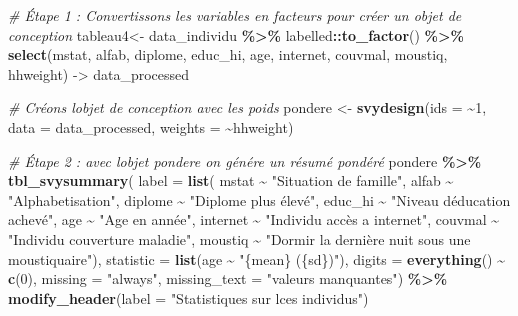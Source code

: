 \documentclass[
]{article}
\newenvironment{Shaded}{\begin{snugshade}}{\end{snugshade}}
\newcommand{\AttributeTok}[1]{\textcolor[rgb]{0.13,0.29,0.53}{#1}}
\newcommand{\CommentTok}[1]{\textcolor[rgb]{0.56,0.35,0.01}{\textit{#1}}}
\newcommand{\DecValTok}[1]{\textcolor[rgb]{0.00,0.00,0.81}{#1}}
\newcommand{\FunctionTok}[1]{\textcolor[rgb]{0.13,0.29,0.53}{\textbf{#1}}}
\newcommand{\NormalTok}[1]{#1}
\newcommand{\OtherTok}[1]{\textcolor[rgb]{0.56,0.35,0.01}{#1}}
\newcommand{\SpecialCharTok}[1]{\textcolor[rgb]{0.81,0.36,0.00}{\textbf{#1}}}
\newcommand{\StringTok}[1]{\textcolor[rgb]{0.31,0.60,0.02}{#1}}
\begin{document}
\begin{Shaded}
\begin{Highlighting}[]
\CommentTok{\# Étape 1 : Convertissons les variables en facteurs pour créer un objet de conception}
\NormalTok{tableau4}\OtherTok{\textless{}{-}}\NormalTok{ data\_individu }\SpecialCharTok{\%\textgreater{}\%}
\NormalTok{  labelled}\SpecialCharTok{::}\FunctionTok{to\_factor}\NormalTok{() }\SpecialCharTok{\%\textgreater{}\%}
  \FunctionTok{select}\NormalTok{(mstat, alfab, diplome, educ\_hi, age, internet, couvmal, moustiq, hhweight) }\OtherTok{{-}\textgreater{}}\NormalTok{ data\_processed}

\CommentTok{\# Créons l\textquotesingle{}objet de conception avec les poids}
\NormalTok{pondere }\OtherTok{\textless{}{-}} \FunctionTok{svydesign}\NormalTok{(}\AttributeTok{ids =} \SpecialCharTok{\textasciitilde{}}\DecValTok{1}\NormalTok{, }\AttributeTok{data =}\NormalTok{ data\_processed, }\AttributeTok{weights =} \SpecialCharTok{\textasciitilde{}}\NormalTok{hhweight)}

\CommentTok{\# Étape 2 : avec l\textquotesingle{}objet pondere on génére un résumé pondéré}
\NormalTok{pondere }\SpecialCharTok{\%\textgreater{}\%}
  \FunctionTok{tbl\_svysummary}\NormalTok{(}
    \AttributeTok{label =} \FunctionTok{list}\NormalTok{(}
\NormalTok{      mstat }\SpecialCharTok{\textasciitilde{}} \StringTok{"Situation de famille"}\NormalTok{, }
\NormalTok{      alfab }\SpecialCharTok{\textasciitilde{}} \StringTok{"Alphabetisation"}\NormalTok{,}
\NormalTok{      diplome }\SpecialCharTok{\textasciitilde{}} \StringTok{"Diplome plus élevé"}\NormalTok{,}
\NormalTok{      educ\_hi }\SpecialCharTok{\textasciitilde{}} \StringTok{"Niveau d\textquotesingle{}éducation achevé"}\NormalTok{, }
\NormalTok{      age }\SpecialCharTok{\textasciitilde{}} \StringTok{"Age en année"}\NormalTok{, }
\NormalTok{      internet }\SpecialCharTok{\textasciitilde{}} \StringTok{"Individu accès a internet"}\NormalTok{, }
\NormalTok{      couvmal }\SpecialCharTok{\textasciitilde{}} \StringTok{"Individu couverture maladie"}\NormalTok{, }
\NormalTok{      moustiq }\SpecialCharTok{\textasciitilde{}} \StringTok{"Dormir la dernière nuit sous une moustiquaire"}\NormalTok{),}
    \AttributeTok{statistic =} \FunctionTok{list}\NormalTok{(age }\SpecialCharTok{\textasciitilde{}} \StringTok{"\{mean\} (\{sd\})"}\NormalTok{),}
    \AttributeTok{digits =} \FunctionTok{everything}\NormalTok{() }\SpecialCharTok{\textasciitilde{}} \FunctionTok{c}\NormalTok{(}\DecValTok{0}\NormalTok{),  }
    \AttributeTok{missing =} \StringTok{"always"}\NormalTok{,}
    \AttributeTok{missing\_text =} \StringTok{"valeurs manquantes"}\NormalTok{) }\SpecialCharTok{\%\textgreater{}\%}
    \FunctionTok{modify\_header}\NormalTok{(}\AttributeTok{label =} \StringTok{"Statistiques sur lces individus"}\NormalTok{)}
\end{Highlighting}
\end{Shaded}
\end{document}
